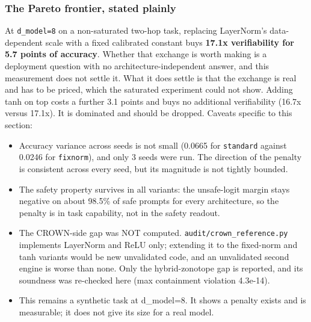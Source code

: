 \documentclass[10pt,journal]{IEEEtran}
\begin{document}
\subsubsection*{The Pareto frontier, stated plainly}
At \texttt{d\_model=8} on a non-saturated two-hop task, replacing LayerNorm's data-dependent scale with a fixed calibrated constant buys \textbf{17.1x verifiability for 5.7 points of accuracy}. Whether that exchange is worth making is a deployment question with no architecture-independent answer, and this measurement does not settle it. What it does settle is that the exchange is real and has to be priced, which the saturated experiment could not show.
Adding tanh on top costs a further 3.1 points and buys no additional verifiability (16.7x versus 17.1x). It is dominated and should be dropped.
Caveats specific to this section:
\begin{itemize}
\item Accuracy variance across seeds is not small (0.0665 for \texttt{standard} against 0.0246 for \texttt{fixnorm}), and only 3 seeds were run. The direction of the penalty is consistent across every seed, but its magnitude is not tightly bounded.
\item The safety property survives in all variants: the unsafe-logit margin stays negative on about 98.5\% of safe prompts for every architecture, so the penalty is in task capability, not in the safety readout.
\item The CROWN-side gap was NOT computed. \texttt{audit/crown\_reference.py} implements LayerNorm and ReLU only; extending it to the fixed-norm and tanh variants would be new unvalidated code, and an unvalidated second engine is worse than none. Only the hybrid-zonotope gap is reported, and its soundness was re-checked here (max containment violation 4.3e-14).
\item This remains a synthetic task at d\_model=8. It shows a penalty exists and is measurable; it does not give its size for a real model.
\end{itemize}
\end{document}
